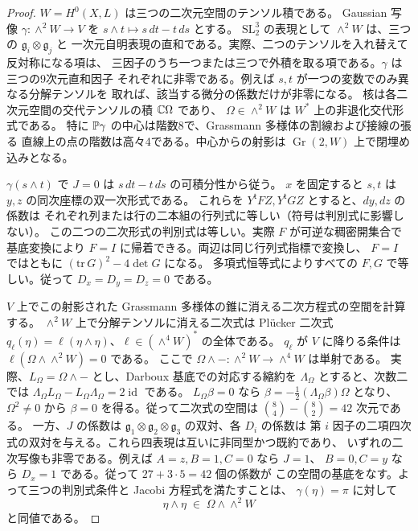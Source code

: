 \begin{proof}
$W=H^0(X,L)$ は三つの二次元空間のテンソル積である。
Gaussian 写像 $\gamma:\wedge^2W\to V$ を $s\wedge t\mapsto s\,dt-t\,ds$ とする。
$\mathrm{SL}_2^3$ の表現として $\wedge^2W$ は、三つの $\mathfrak g_i\otimes\mathfrak g_j$ と
一次元自明表現の直和である。実際、二つのテンソルを入れ替えて反対称になる項は、
三因子のうち一つまたは三つで外積を取る項である。$\gamma$ は三つの9次元直和因子
それぞれに非零である。例えば $s,t$ が一つの変数でのみ異なる分解テンソルを
取れば、該当する微分の係数だけが非零になる。
核は各二次元空間の交代テンソルの積 $\mathbb C\Omega$ であり、
$\Omega\in\wedge^2 W$ は $W^*$ 上の非退化交代形式である。
特に $\mathbb P\gamma$ の中心は階数8で、Grassmann 多様体の割線および接線の張る
直線上の点の階数は高々4である。中心からの射影は $\operatorname{Gr}(2,W)$ 上で閉埋め込みとなる。

$\gamma(s\wedge t)$ で $J=0$ は $s\,dt-t\,ds$ の可積分性から従う。
$x$ を固定すると $s,t$ は $y,z$ の同次座標の双一次形式である。
これらを $Y^{\mathsf t}FZ,Y^{\mathsf t}GZ$ とすると、$dy,dz$ の係数は
それぞれ列または行の二本組の行列式に等しい（符号は判別式に影響しない）。
この二つの二次形式の判別式は等しい。実際 $F$ が可逆な稠密開集合で
基底変換により $F=I$ に帰着できる。両辺は同じ行列式指標で変換し、
$F=I$ ではともに $(\mathrm{tr}\,G)^2-4\det G$ になる。
多項式恒等式によりすべての $F,G$ で等しい。従って $D_x=D_y=D_z=0$ である。

$V$ 上でこの射影された Grassmann 多様体の錐に消える二次方程式の空間を計算する。
$\wedge^2W$ 上で分解テンソルに消える二次式は Plücker 二次式
$q_\ell(\eta)=\ell(\eta\wedge\eta)$、$\ell\in(\wedge^4 W)^*$ の全体である。
$q_\ell$ が $V$ に降りる条件は $\ell(\Omega\wedge\wedge^2W)=0$ である。
ここで $\Omega\wedge-:\wedge^2W\to\wedge^4W$ は単射である。
実際、$L_\Omega=\Omega\wedge-$ とし、Darboux 基底での対応する縮約を
$\Lambda_\Omega$ とすると、次数二では
$\Lambda_\Omega L_\Omega-L_\Omega\Lambda_\Omega=2\operatorname{id}$ である。
$L_\Omega\beta=0$ なら
$\beta=-\frac12(\Lambda_\Omega\beta)\Omega$ となり、
$\Omega^2\ne0$ から $\beta=0$ を得る。従って二次式の空間は
$\binom84-\binom82=42$ 次元である。
一方、$J$ の係数は $\mathfrak g_1\otimes\mathfrak g_2\otimes\mathfrak g_3$ の双対、各 $D_i$ の係数は
第 $i$ 因子の二項四次式の双対を与える。これら四表現は互いに非同型かつ既約であり、
いずれの二次写像も非零である。例えば $A=z,B=1,C=0$ なら $J=1$、
$B=0,C=y$ なら $D_x=1$ である。従って $27+3\cdot5=42$ 個の係数が
この空間の基底をなす。よって三つの判別式条件と Jacobi 方程式を満たすことは、
$\gamma(\eta)=\pi$ に対して
\begin{equation}\label{cube:eq:primitive}
 \eta\wedge\eta\;\in\;\Omega\wedge\wedge^2W
\end{equation}
と同値である。


\end{proof}

